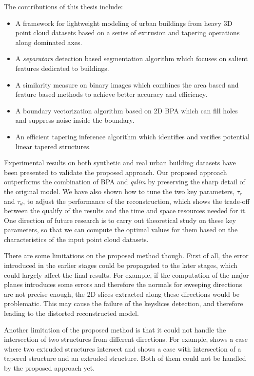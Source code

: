 The contributions of this thesis include:
\begin{itemize}
\item {
A framework for lightweight modeling of urban buildings
from heavy 3D point cloud datasets based on a series of
extrusion and tapering operations along dominated axes.
}
\item {
A {\it separators} detection based segmentation algorithm
which focuses on salient features dedicated to buildings.
}
\item {
A similarity measure on binary images which combines
the area based and feature based methods to achieve
better accuracy and efficiency.
}
\item {
A boundary vectorization algorithm based on 2D BPA which
can fill holes and suppress noise inside the boundary.
}
\item {
An efficient tapering inference algorithm which identifies
and verifies potential linear tapered structures.
}
\end{itemize}

Experimental results on both synthetic and real urban building datasets
have been presented to validate the proposed approach.
Our proposed approach outperforms the combination of BPA and {\it qslim }
by preserving the sharp detail of the original model.
We have also shown how to tune the two key parameters, $\tau_r$ and $\tau_d$,
to adjust the performance of the reconstruction,
which shows the trade-off between the qualify of the results
and the time and space resources needed for it.
One direction of future research is to carry out
theoretical study on these key parameters,
so that we can compute the optimal values for them based on
the characteristics of the input point cloud datasets.

There are some limitations on the proposed method though.
First of all, the error introduced in the earlier stages could be
propagated to the later stages, which could largely affect the final results.
For example, if the computation of the major planes
introduces some errors and therefore the normals for sweeping
directions are not precise enough,
the 2D slices extracted along these directions would be problematic.
This may cause the failure of the keyslices detection,
and therefore leading to the distorted reconstructed model.

Another limitation of the proposed method is that
it could not handle the intersection of two structures
from different directions.
For example,  shows a case where two extruded structures
intersect and  shows a case with intersection
of a tapered structure and an extruded structure.
Both of them could not be handled by the proposed approach yet.

